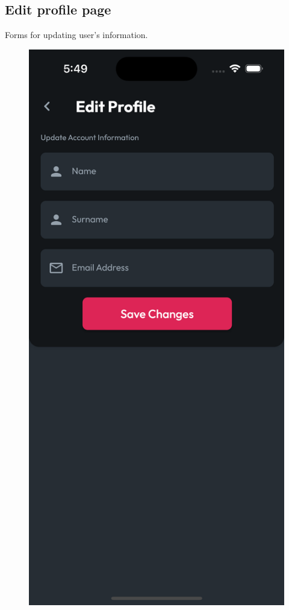 \documentclass{Configuration_Files/PoliMi3i_thesis}
\begin{document}
\subsection{Edit profile page}

\begin{minipage}{\linewidth}
    Forms for updating user's information.
\end{minipage}

\begin{figure}[!h]
  \centering
  \includegraphics[scale=0.1]{Images/Screenshots/Mobile/EditProfile.png}

\end{figure}
\end{document}
